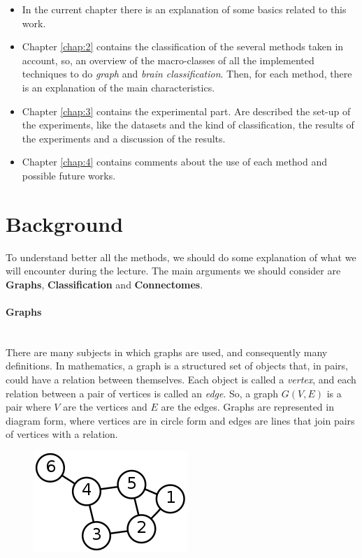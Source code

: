 \begin{itemize}
	\item In the current chapter there is an explanation of some basics related to this work.
	\item Chapter \ref{chap:2} contains the classification of the several methods taken in account, so, an overview of the macro-classes of all the implemented techniques to do \emph{graph} and \emph{brain classification}. 
	Then, for each method, there is an explanation of the main characteristics.
	\item Chapter \ref{chap:3} contains the experimental part. Are described the set-up of the experiments, like the datasets and the kind of classification, the results of the experiments and a discussion of the results.
	\item Chapter \ref{chap:4} contains comments about the use of each method and possible future works. 
\end{itemize}

\section{Background}
To understand better all the methods, we should do some explanation of what we will encounter during the lecture. The main arguments we should consider are \textbf{Graphs}, \textbf{Classification} and \textbf{Connectomes}.

\paragraph{Graphs} \
\\
There are many subjects in which graphs are used, and consequently many definitions. In mathematics, a graph is a structured set of objects that, in pairs, could have a relation between themselves. Each object is called a \textit{vertex}, and each relation between a pair of vertices is called an \textit{edge}. So, a graph $ G(V,E) $ is a pair where $ V $ are the vertices and $ E $ are the edges. Graphs are represented in diagram form, where vertices are in circle form and edges are lines that join pairs of vertices with a relation.
\begin{figure}[htbp]
	\centering
	\includegraphics[scale=0.5]{Immagini/220px-6n-graf.svg.png}
	\caption{\label{fig:diagram}}
\end{figure}


